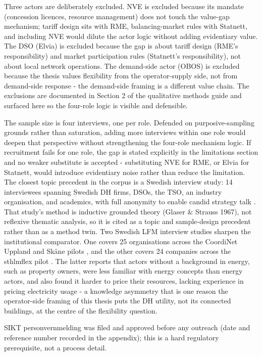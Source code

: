 Three actors are deliberately excluded. NVE is excluded because its mandate (concession licences, resource management) does not touch the value-gap mechanism; tariff design sits with RME, balancing-market rules with Statnett, and including NVE would dilute the actor logic without adding evidentiary value. The DSO (Elvia) is excluded because the gap is about tariff design (RME's responsibility) and market participation rules (Statnett's responsibility), not about local network operations. The demand-side actor (OBOS) is excluded because the thesis values flexibility from the operator-supply side, not from demand-side response - the demand-side framing is a different value chain. The exclusions are documented in Section 2 of the qualitative methods guide and surfaced here so the four-role logic is visible and defensible.

The sample size is four interviews, one per role. Defended on purposive-sampling grounds rather than saturation, adding more interviews within one role would deepen that perspective without strengthening the four-role mechanism logic. If recruitment fails for one role, the gap is stated explicitly in the limitations section and no weaker substitute is accepted - substituting NVE for RME, or Elvia for Statnett, would introduce evidentiary noise rather than reduce the limitation. The closest topic precedent in the corpus is a Swedish interview study: 14 interviewees spanning Swedish DH firms, DSOs, the TSO, an industry organisation, and academics, with full anonymity to enable candid strategy talk \cite{fernqvist_district_2023}. That study's method is inductive grounded theory (Glaser \& Strauss 1967), not reflexive thematic analysis, so it is cited as a topic and sample-design precedent rather than as a method twin. Two Swedish LFM interview studies sharpen the institutional comparator. One covers 25 organisations across the CoordiNet Uppland and Skåne pilots \cite{palm_drivers_2023}, and the other covers 24 companies across the sthlmflex pilot \cite{nyman_how_2026}. The latter reports that actors without a background in energy, such as property owners, were less familiar with energy concepts than energy actors, and also found it harder to price their resources, lacking experience in pricing electricity usage - a knowledge asymmetry that is one reason the operator-side framing of this thesis puts the DH utility, not its connected buildings, at the centre of the flexibility question.

SIKT personvernmelding was filed and approved before any outreach (date and reference number recorded in the appendix); this is a hard regulatory prerequisite, not a process detail. 


